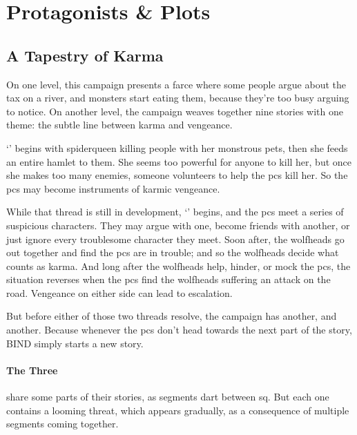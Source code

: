 \chapter{Protagonists \& Plots}
\label{sideQuestIntro}

\section{A Tapestry of Karma}
\label{sqSummaries}

\begin{multicols}{2}


\noindent
On one level, this \gls{campaign} presents a farce where some people argue about the tax on a river, and monsters start eating them, because they're too busy arguing to notice.
On another level, the \gls{campaign} weaves together nine stories with one theme: the subtle line between karma and vengeance.

`' begins with \gls{spiderqueen} killing people with her monstrous pets, then she feeds an entire hamlet to them.
She seems too powerful for anyone to kill her, but once she makes too many enemies, someone volunteers to help the \glspl{pc} kill her.
So the \glspl{pc} may become instruments of karmic vengeance.

While that thread is still in development, `' begins, and the \glspl{pc} meet a series of suspicious characters.
They may argue with one, become friends with another, or just ignore every troublesome character they meet.
Soon after, the \glspl{wolfhead} go out together and find the \glspl{pc} are in trouble; and so the \glspl{wolfhead} decide what counts as karma.
And long after the \glspl{wolfhead} help, hinder, or mock the \glspl{pc}, the situation reverses when the \glspl{pc} find the \glspl{wolfhead} suffering an attack on the road.
Vengeance on either side can lead to escalation.

But before either of those two threads resolve, the \gls{campaign} has another, and another.
Because whenever the \glspl{pc} don't head towards the next part of the story, BIND simply starts a new story.


\subsubsection{The Three }
share some parts of their stories, as \glspl{segment} dart between \gls{sq}.
But each one contains a looming threat, which appears gradually, as a consequence of multiple \glspl{segment} coming together.



\end{multicols}

